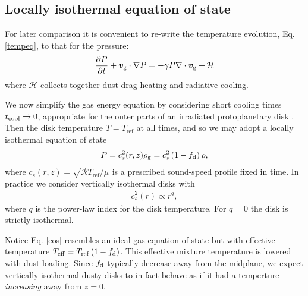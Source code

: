 \subsection{Locally isothermal equation of state}\label{loc_iso_eos}
For later comparison it is convenient to re-write the temperature
evolution, Eq. \ref{tempeq}, to that for the pressure: 
\begin{align}
  \frac{\partial P}{\partial t} + \bm{v}_\mathrm{g}\cdot\nabla P = - \gamma P
  \nabla\cdot \bm{v}_\mathrm{g}  + \mathcal{H} 
\end{align}
where $\mathcal{H}$ collects together dust-drag heating and radiative
cooling. 

We now simplify the gas energy equation by considering short cooling 
times $t_\mathrm{cool}\to 0$, appropriate for the outer parts of an irradiated
protoplanetary disk \citep{chiang97,lin15}. Then the disk temperature
$T = T_\mathrm{ref}$ at all times, and so we may
adopt a locally isothermal equation of state 
\begin{align}\label{eos}
  P = c_s^2(r,z)\rho_\mathrm{g} = c_s^{2}\left(1 - f_\mathrm{d}\right)\rho,   
\end{align}
where $c_s(r,z)= \sqrt{\mathcal{R}T_\mathrm{ref}/\mu}$ is a prescribed
sound-speed profile fixed in time. In practice we consider vertically 
isothermal disks with \begin{align}\label{power_temp}
  c_s^2(r) \propto r^{q},
\end{align}
where $q$ is the power-law index for the disk temperature. For $q=0$
the disk is strictly isothermal.  

Notice Eq. \ref{eos} resembles an ideal gas equation of state but with  
effective temperature $T_\mathrm{eff} = 
T_\mathrm{ref}\left(1-f_\mathrm{d}\right)$. %
This effective mixture  
temperature is lowered with dust-loading. 
Since $f_\mathrm{d}$ typically decrease away from the midplane, we expect
vertically isothermal dusty disks to in fact behave as if it had a
temperture \emph{increasing} away from $z=0$.  

